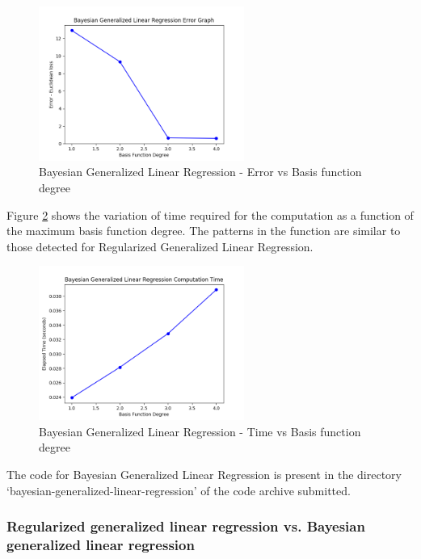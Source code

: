 \documentclass[parskip=full]{scrartcl}
\begin{document}
        \begin{figure}[ht]
            \centering
            \includegraphics[width=0.6\textwidth]{3b_degree_vs_error.png}
            \caption{Bayesian Generalized Linear Regression - Error vs Basis function degree}
            \label{fig:bglg_err_v_deg}
        \end{figure}

        Figure \ref{fig:bglg_time_v_deg} shows the variation of time required for the computation as a function of the maximum basis function degree. The patterns in the function are similar to those detected for Regularized Generalized Linear Regression. 

        \begin{figure}[ht]
            \centering
            \includegraphics[width=0.6\textwidth]{3b_degree_vs_time.png}
            \caption{Bayesian Generalized Linear Regression - Time vs Basis function degree}
            \label{fig:bglg_time_v_deg}
        \end{figure}

        The code for Bayesian Generalized Linear Regression is present in the directory `bayesian-generalized-linear-regression' of the code archive submitted.

        \subsubsection*{Regularized generalized linear regression vs. Bayesian generalized linear regression} %
        \label{ssub:regularized_generalized_linear_regression_vs_bayesian_generalized_linear_regression}
\end{document}
